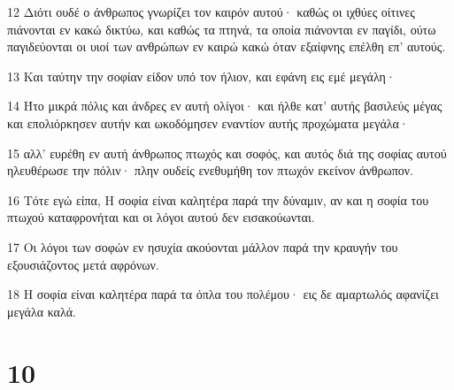\par 12 Διότι ουδέ ο άνθρωπος γνωρίζει τον καιρόν αυτού· καθώς οι ιχθύες οίτινες πιάνονται εν κακώ δικτύω, και καθώς τα πτηνά, τα οποία πιάνονται εν παγίδι, ούτω παγιδεύονται οι υιοί των ανθρώπων εν καιρώ κακώ όταν εξαίφνης επέλθη επ' αυτούς.
\par 13 Και ταύτην την σοφίαν είδον υπό τον ήλιον, και εφάνη εις εμέ μεγάλη·
\par 14 Ήτο μικρά πόλις και άνδρες εν αυτή ολίγοι· και ήλθε κατ' αυτής βασιλεύς μέγας και επολιόρκησεν αυτήν και ωκοδόμησεν εναντίον αυτής προχώματα μεγάλα·
\par 15 αλλ' ευρέθη εν αυτή άνθρωπος πτωχός και σοφός, και αυτός διά της σοφίας αυτού ηλευθέρωσε την πόλιν· πλην ουδείς ενεθυμήθη τον πτωχόν εκείνον άνθρωπον.
\par 16 Τότε εγώ είπα, Η σοφία είναι καλητέρα παρά την δύναμιν, αν και η σοφία του πτωχού καταφρονήται και οι λόγοι αυτού δεν εισακούωνται.
\par 17 Οι λόγοι των σοφών εν ησυχία ακούονται μάλλον παρά την κραυγήν του εξουσιάζοντος μετά αφρόνων.
\par 18 Η σοφία είναι καλητέρα παρά τα όπλα του πολέμου· εις δε αμαρτωλός αφανίζει μεγάλα καλά.

\chapter{10}


